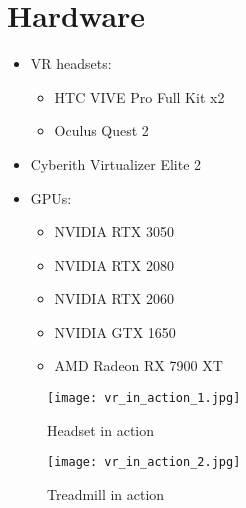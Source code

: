 \newpage
\section{Hardware}
\label{sec:hardware}
\begin{itemize}
    \item VR headsets:
    \begin{itemize}
        \item HTC VIVE Pro Full Kit x2\\ %
        \item Oculus Quest 2\\
    \end{itemize}
    \item Cyberith Virtualizer Elite 2\\
    \item GPUs:
    \begin{itemize}
        \item NVIDIA RTX 3050\\
        \item NVIDIA RTX 2080\\
        \item NVIDIA RTX 2060\\
        \item NVIDIA GTX 1650\\
        \item AMD Radeon RX 7900 XT\\
    \end{itemize}
\end{itemize}
  
\begin{figure} %
  \texttt{[image: vr\_in\_action\_1.jpg]}
  \caption{Headset in action}
\end{figure}
\begin{figure}
  \texttt{[image: vr\_in\_action\_2.jpg]}
  \caption{Treadmill in action}
\end{figure}